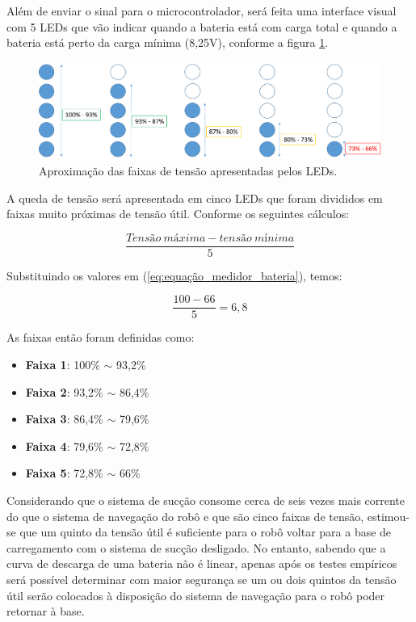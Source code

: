 		Além de enviar o sinal para o microcontrolador, será feita uma interface visual com 5 LEDs que vão indicar quando a bateria está com carga total e quando a bateria está perto da carga mínima (8,25V), conforme a figura \ref{img:faixa_de_tensão}.

		\begin{figure}[H]
			\centering
			\includegraphics[scale=0.3]{figuras/LEDs.png}
			\caption{Aproximação das faixas de tensão apresentadas pelos LEDs.}
			\label{img:faixa_de_tensão}
		\end{figure}

		A queda de tensão será apresentada em cinco LEDs que foram divididos em faixas muito próximas de tensão útil. Conforme os seguintes cálculos:

		\begin{equation}
		\label{eq:equação_medidor_bateria}
			\frac{Tensão\ máxima - tensão\ mínima}{5}  
		\end{equation}

		Substituindo os valores em (\ref{eq:equação_medidor_bateria}), temos:

		\begin{equation}
		\label{eq:equação_medidor_bateria_2}
			\frac{100-66}{5} = 6,8  
		\end{equation}

		As faixas então foram definidas como:

		\begin{itemize}
			\item \textbf{Faixa 1}: 100\% $\sim$ 93,2\%
			\item \textbf{Faixa 2}: 93,2\% $\sim$ 86,4\%
			\item \textbf{Faixa 3}: 86,4\% $\sim$ 79,6\%
			\item \textbf{Faixa 4}: 79,6\% $\sim$ 72,8\%
			\item \textbf{Faixa 5}: 72,8\% $\sim$ 66\%
		\end{itemize}
		
		Considerando que o sistema de sucção consome cerca de seis vezes mais corrente do que o sistema de navegação do robô e que são cinco faixas de tensão, estimou-se que um quinto da tensão útil é suficiente para o robô voltar para a base de carregamento com o sistema de sucção desligado. No entanto, sabendo que a curva de descarga de uma bateria não é linear, apenas após os testes empíricos será possível determinar com maior segurança se um ou dois quintos da tensão útil serão colocados à disposição do sistema de navegação para o robô poder retornar à base. 

